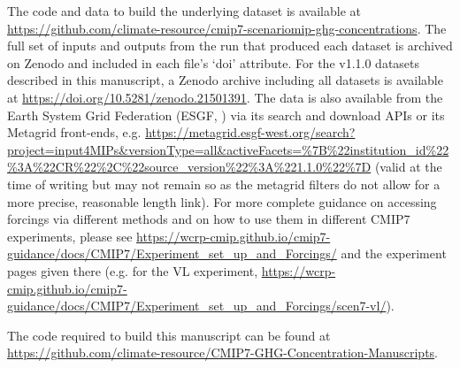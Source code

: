The code and data to build the underlying dataset is available at
\newline \mbox{\url{https://github.com/climate-resource/cmip7-scenariomip-ghg-concentrations}}.
The full set of inputs and outputs from the run that produced each dataset is archived on Zenodo
and included in each file's `doi' attribute.
For the v1.1.0 datasets described in this manuscript, a Zenodo archive including all datasets is available at
\url{https://doi.org/10.5281/zenodo.21501391}.
The data is also available from the Earth System Grid Federation (ESGF, \citealp{esgf_docs_2025})
via its search and download APIs or its Metagrid front-ends, e.g.
\url{https://metagrid.esgf-west.org/search?project=input4MIPs&versionType=all&activeFacets=\%7B\%22institution_id\%22\%3A\%22CR\%22\%2C\%22source_version\%22\%3A\%221.1.0\%22\%7D}
(valid at the time of writing but may not remain so as the metagrid filters do not allow for a more precise, reasonable length link).
For more complete guidance on accessing forcings via different methods
and on how to use them in different CMIP7 experiments, please see
\newline \mbox{\url{https://wcrp-cmip.github.io/cmip7-guidance/docs/CMIP7/Experiment_set_up_and_Forcings/}}
and the experiment pages given there
\newline (e.g. for the VL experiment, \mbox{\url{https://wcrp-cmip.github.io/cmip7-guidance/docs/CMIP7/Experiment_set_up_and_Forcings/scen7-vl/}}).

The code required to build this manuscript can be found at
\url{https://github.com/climate-resource/CMIP7-GHG-Concentration-Manuscripts}.
